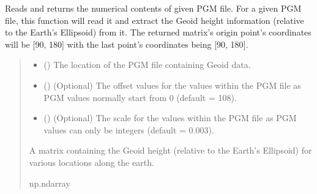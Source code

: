\documentclass[letterpaper,10pt,english]{sphinxmanual}
\begin{document}

\begin{fulllineitems}
\label{\detokenize{modules/earth/geoid:qnav.earth.geoid.read_pgm_data}}
\pysigstartsignatures
{}
\pysigstopsignatures
\sphinxAtStartPar
Reads and returns the numerical contents of given PGM file.
For a given PGM file, this function will read it and extract the Geoid
height information (relative to the Earth’s Ellipsoid) from it. The
returned matrix’s origin point’s coordinates will be {[}90, \sphinxhyphen{}180{]} with the
last point’s coordinates being {[}\sphinxhyphen{}90, 180{]}.
\begin{quote}\begin{description}
\begin{itemize}
\item {} 
\sphinxAtStartPar
{} () \textendash{} The location of the PGM file containing Geoid data.

\item {} 
\sphinxAtStartPar
{} () \textendash{} (Optional) The offset values for the values within the
PGM file as PGM values normally start from 0 (default = \sphinxhyphen{}108).

\item {} 
\sphinxAtStartPar
{} () \textendash{} (Optional) The scale for the values within the PGM file
as PGM values can only be integers (default = 0.003).

\end{itemize}

\sphinxAtStartPar
A matrix containing the Geoid height (relative to the Earth’s
Ellipsoid) for various locations along the earth.

\sphinxAtStartPar
np.ndarray

\end{description}\end{quote}

\end{fulllineitems}
\end{document}
